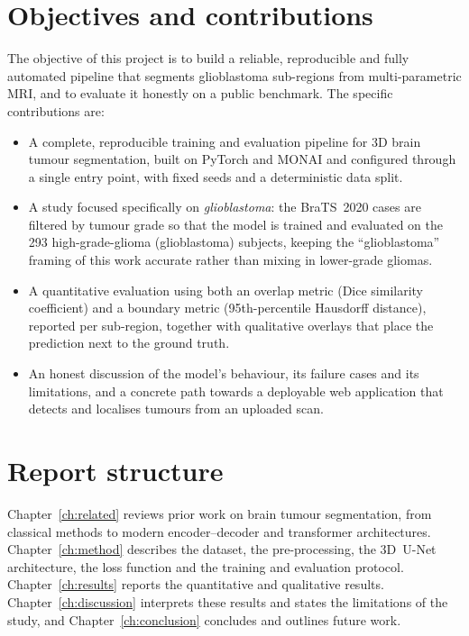 \section{Objectives and contributions}

The objective of this project is to build a reliable, reproducible and fully
automated pipeline that segments glioblastoma sub-regions from multi-parametric
MRI, and to evaluate it honestly on a public benchmark. The specific
contributions are:

\begin{itemize}
  \item A complete, reproducible training and evaluation pipeline for 3D brain
        tumour segmentation, built on PyTorch and MONAI and configured through a
        single entry point, with fixed seeds and a deterministic data split.
  \item A study focused specifically on \emph{glioblastoma}: the BraTS~2020
        cases are filtered by tumour grade so that the model is trained and
        evaluated on the 293 high-grade-glioma (glioblastoma) subjects, keeping
        the ``glioblastoma'' framing of this work accurate rather than mixing in
        lower-grade gliomas.
  \item A quantitative evaluation using both an overlap metric (Dice similarity
        coefficient) and a boundary metric (95th-percentile Hausdorff distance),
        reported per sub-region, together with qualitative overlays that place the
        prediction next to the ground truth.
  \item An honest discussion of the model's behaviour, its failure cases and its
        limitations, and a concrete path towards a deployable web application
        that detects and localises tumours from an uploaded scan.
\end{itemize}

\section{Report structure}

Chapter~\ref{ch:related} reviews prior work on brain tumour segmentation, from
classical methods to modern encoder--decoder and transformer architectures.
Chapter~\ref{ch:method} describes the dataset, the pre-processing, the 3D~U-Net
architecture, the loss function and the training and evaluation protocol.
Chapter~\ref{ch:results} reports the quantitative and qualitative results.
Chapter~\ref{ch:discussion} interprets these results and states the limitations
of the study, and Chapter~\ref{ch:conclusion} concludes and outlines future work.
